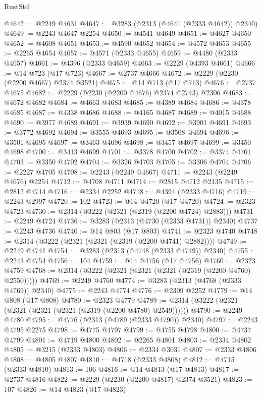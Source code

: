 \begin{lexlean}{RustStd}
\begin{coremodule}
@4642 := @2249 @4631
@4647 := @3283 (@2313 (@4641 (@2333 @4642)) @2340)
@4649 := @2243 @4647 @2254
@4650 := @4541 @4649
@4651 := @4627 @4650
@4652 := @4608 @4651
@4653 := @4590 @4652
@4654 := @4572 @4653
@4655 := @2265 @4654
@4657 := @4571 (@2333 @4655)
@4659 := @4480 (@2333 @4657)
@4661 := @4396 (@2333 @4659)
@4663 := @2229 (@4393 @4661)
@4666 := @14 @723 (@17 @723)
@4667 := @2737 @4666
@4672 := @2229 (@2230 (@2200 @4667) @2374 @3521)
@4675 := @14 @713 (@17 @713)
@4676 := @2737 @4675
@4682 := @2229 (@2230 (@2200 @4676) @2374 @2743) @2306
@4683 := @4672 @4682
@4684 := @4663 @4683
@4685 := @4389 @4684
@4686 := @4378 @4685
@4687 := @4338 @4686
@4688 := @4165 @4687
@4689 := @4015 @4688
@4690 := @3977 @4689
@4691 := @3939 @4690
@4692 := @3901 @4691
@4693 := @3772 @4692
@4694 := @3555 @4693
@4695 := @3508 @4694
@4696 := @3501 @4695
@4697 := @3463 @4696
@4698 := @3457 @4697
@4699 := @3450 @4698
@4700 := @3413 @4699
@4701 := @3378 @4700
@4702 := @3374 @4701
@4703 := @3350 @4702
@4704 := @3326 @4703
@4705 := @3306 @4704
@4706 := @2227 @4705
@4708 := @2243 (@2249 @4667)
@4711 := @2243 (@2249 @4676) @2254
@4712 := @4708 @4711
@4714 := @2815 @4712 @2135
@4715 := @2812 @4714
@4716 := @2334 @2252
@4718 := @4394 (@2333 @4716)
@4719 := @2243 @2997
@4720 := 102
@4723 := @14 @4720 (@17 @4720)
@4724 := @2323 @4723
@4730 := @2314 (@3222 (@2321 (@2319 (@2200 @4724) @2883)))
@4731 := @2249 @4724
@4736 := @3283 (@2313 (@4730 (@2333 @4731)) @2340)
@4737 := @2243 @4736
@4740 := @14 @803 (@17 @803)
@4741 := @2323 @4740
@4748 := @2314 (@3222 (@2321 (@2321 (@2319 (@2200 @4741) @2882))))
@4749 := @2249 @4741
@4754 := @3283 (@2313 (@4748 (@2333 @4749)) @2340)
@4755 := @2243 @4754
@4756 := 104
@4759 := @14 @4756 (@17 @4756)
@4760 := @2323 @4759
@4768 := @2314 (@3222 (@2321 (@2321 (@2321 (@2319 (@2200 @4760) @2550)))))
@4769 := @2249 @4760
@4774 := @3283 (@2313 (@4768 (@2333 @4769)) @2340)
@4775 := @2243 @4774
@4776 := @2309 @2252
@4779 := @14 @808 (@17 @808)
@4780 := @2323 @4779
@4789 := @2314 (@3222 (@2321 (@2321 (@2321 (@2321 (@2319 (@2200 @4780) @2549))))))
@4790 := @2249 @4780
@4795 := @4776 (@2313 (@4789 (@2333 @4790)) @2340)
@4797 := @2243 @4795 @2275
@4798 := @4775 @4797
@4799 := @4755 @4798
@4800 := @4737 @4799
@4801 := @4719 @4800
@4802 := @2265 @4801
@4803 := @2334 @4802
@4805 := @3215 (@2333 @4803)
@4806 := @2334 @3031
@4807 := @2333 @4806
@4808 := @4805 @4807
@4810 := @4718 (@2333 @4808)
@4812 := @4715 (@2333 @4810)
@4813 := 106
@4816 := @14 @4813 (@17 @4813)
@4817 := @2737 @4816
@4822 := @2229 (@2230 (@2200 @4817) @2374 @3521)
@4823 := 107
@4826 := @14 @4823 (@17 @4823)

\end{coremodule}
\end{lexlean}
